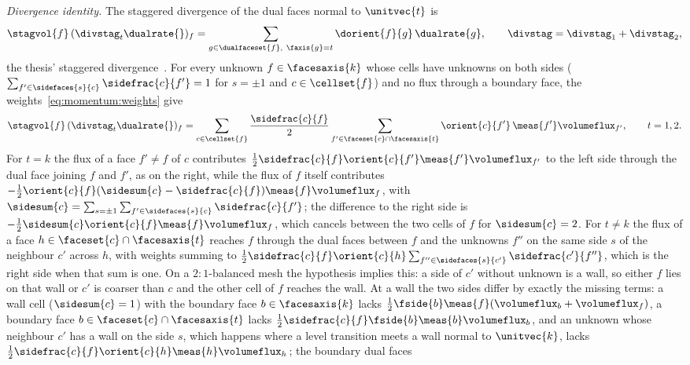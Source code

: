 \emph{Divergence identity.} The staggered divergence of the dual faces
normal to $\unitvec{t}$ is
\begin{equation}\label{eq:momentum:dual-divergence}
  \stagvol{f}\,(\divstag_{t}\dualrate{})_f=\sum_{g\in\dualfaceset{f},\ \faxis{g}=t}\dorient{f}{g}\,\dualrate{g},
  \qquad \divstag=\divstag_1+\divstag_2,
\end{equation}
the thesis' staggered divergence~. For every unknown
$f\in\facesaxis{k}$ whose cells have unknowns on both sides
($\sum_{f'\in\sidefaces{s}{c}}\sidefrac{c}{f'}=1$ for $s=\pm1$ and
$c\in\cellset{f}$) and no flux through a boundary face, the
weights~\cref{eq:momentum:weights} give
\begin{equation}\label{eq:momentum:identity}
  \stagvol{f}\,(\divstag_{t}\dualrate{})_f
  =\sum_{c\in\cellset{f}}\frac{\sidefrac{c}{f}}{2}
    \sum_{f'\in\faceset{c}\cap\facesaxis{t}}\orient{c}{f'}\,\meas{f'}\volumeflux_{f'},
  \qquad t=1,2.
\end{equation}
For $t=k$ the flux of a face $f'\neq f$ of $c$ contributes
$\half\sidefrac{c}{f}\orient{c}{f'}\meas{f'}\volumeflux_{f'}$ to the left side
through the dual face joining $f$ and $f'$, as on the right, while the flux of
$f$ itself contributes $-\half\orient{c}{f}(\sidesum{c}-\sidefrac{c}{f})\meas{f}\volumeflux_f$,
with $\sidesum{c}=\sum_{s=\pm1}\sum_{f'\in\sidefaces{s}{c}}\sidefrac{c}{f'}$; the
difference to the right side is $-\half\sidesum{c}\orient{c}{f}\meas{f}\volumeflux_f$,
which cancels between the two cells of $f$ for $\sidesum{c}=2$. For $t\neq k$
the flux of a face $h\in\faceset{c}\cap\facesaxis{t}$ reaches $f$ through the
dual faces between $f$ and the unknowns $f''$ on the same side $s$ of the
neighbour $c'$ across $h$, with weights summing to
$\half\sidefrac{c}{f}\orient{c}{h}\sum_{f''\in\sidefaces{s}{c'}}\sidefrac{c'}{f''}$,
which is the right side when that sum is one. On a $2{:}1$-balanced mesh the
hypothesis implies this: a side of $c'$ without unknown is a wall, so either
$f$ lies on that wall or $c'$ is coarser than $c$ and the other cell of $f$
reaches the wall. At a wall the two sides differ by exactly the missing terms:
a wall cell ($\sidesum{c}=1$) with the boundary face $b\in\facesaxis{k}$ lacks
$\half\fside{b}\meas{f}(\volumeflux_b+\volumeflux_f)$, a boundary face
$b\in\faceset{c}\cap\facesaxis{t}$ lacks $\half\sidefrac{c}{f}\fside{b}\meas{b}\volumeflux_b$,
and an unknown whose neighbour $c'$ has a wall on the side $s$, which happens
where a level transition meets a wall normal to $\unitvec{k}$, lacks
$\half\sidefrac{c}{f}\orient{c}{h}\meas{h}\volumeflux_h$; the boundary dual faces
